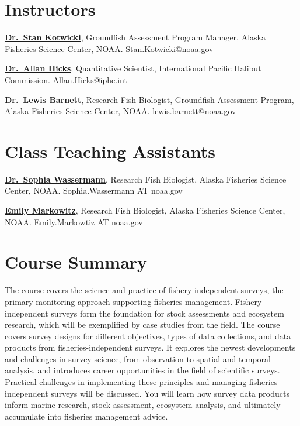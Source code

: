 \documentclass[
  letterpaper,
  oneside,
  open=any]{scrbook}
\begin{document}
\section{Instructors}\label{instructors}

\href{https://www.fisheries.noaa.gov/contact/stan-kotwicki}{\textbf{Dr.~Stan
Kotwicki}}, Groundfish Assessment Program Manager, Alaska Fisheries
Science Center, NOAA. Stan.Kotwicki@noaa.gov

\href{https://www.iphc.int/staff/allan-hicks-ph-d/}{\textbf{Dr.~Allan
Hicks}}, Quantitative Scientist, International Pacific Halibut
Commission. Allan.Hicks@iphc.int

\href{https://lewisbarnett.wordpress.com/}{\textbf{Dr.~Lewis Barnett}},
Research Fish Biologist, Groundfish Assessment Program, Alaska Fisheries
Science Center, NOAA. lewis.barnett@noaa.gov

\section{Class Teaching Assistants}\label{class-teaching-assistants}

\href{https://sowasser.com/}{\textbf{Dr.~Sophia Wassermann}}, Research
Fish Biologist, Alaska Fisheries Science Center, NOAA. Sophia.Wassermann
AT noaa.gov

\href{https://www.fisheries.noaa.gov/contact/emily-markowitz}{\textbf{Emily
Markowitz}}, Research Fish Biologist, Alaska Fisheries Science Center,
NOAA. Emily.Markowtiz AT noaa.gov

\section{Course Summary}\label{course-summary}

The course covers the science and practice of fishery-independent
surveys, the primary monitoring approach supporting fisheries
management. Fishery-independent surveys form the foundation for stock
assessments and ecosystem research, which will be exemplified by case
studies from the field. The course covers survey designs for different
objectives, types of data collections, and data products from
fisheries-independent surveys. It explores the newest developments and
challenges in survey science, from observation to spatial and temporal
analysis, and introduces career opportunities in the field of scientific
surveys. Practical challenges in implementing these principles and
managing fisheries-independent surveys will be discussed. You will learn
how survey data products inform marine research, stock assessment,
ecosystem analysis, and ultimately accumulate into fisheries management
advice.
\end{document}
